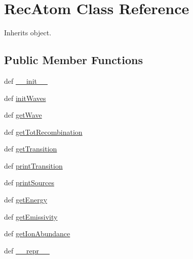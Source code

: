 \hypertarget{classpyneb_1_1core_1_1pynebcore_1_1_rec_atom}{\section{Rec\-Atom Class Reference}
\label{classpyneb_1_1core_1_1pynebcore_1_1_rec_atom}
}


Inherits object.

\subsection*{Public Member Functions}
\begin{DoxyCompactItemize}
\item 
def \hyperlink{classpyneb_1_1core_1_1pynebcore_1_1_rec_atom_ac775ee34451fdfa742b318538164070e}{\-\_\-\-\_\-init\-\_\-\-\_\-}
\item 
def \hyperlink{classpyneb_1_1core_1_1pynebcore_1_1_rec_atom_a585a5ccbf1996b61e811632daf83d9a5}{init\-Waves}
\item 
def \hyperlink{classpyneb_1_1core_1_1pynebcore_1_1_rec_atom_a70e7c07961cb65cbef72a83053ff77c4}{get\-Wave}
\item 
def \hyperlink{classpyneb_1_1core_1_1pynebcore_1_1_rec_atom_a59deba69fded8f0f17b40c917df3a09c}{get\-Tot\-Recombination}
\item 
def \hyperlink{classpyneb_1_1core_1_1pynebcore_1_1_rec_atom_acf586a33a19e340d5da3ddd7fcf84f9c}{get\-Transition}
\item 
def \hyperlink{classpyneb_1_1core_1_1pynebcore_1_1_rec_atom_a69ea809ac1bda5a46d5a167ea3c2754c}{print\-Transition}
\item 
def \hyperlink{classpyneb_1_1core_1_1pynebcore_1_1_rec_atom_a0120b7dbd5f911f8b1df2d2cebf6c09c}{print\-Sources}
\item 
def \hyperlink{classpyneb_1_1core_1_1pynebcore_1_1_rec_atom_a8406acc27904d955ee4dbb458f60db52}{get\-Energy}
\item 
def \hyperlink{classpyneb_1_1core_1_1pynebcore_1_1_rec_atom_aa6ddd446c1d80542fdb2fb93e5d7f1af}{get\-Emissivity}
\item 
def \hyperlink{classpyneb_1_1core_1_1pynebcore_1_1_rec_atom_a71c604d2b2dc23f3435338cdee5d68bf}{get\-Ion\-Abundance}
\item 
def \hyperlink{classpyneb_1_1core_1_1pynebcore_1_1_rec_atom_ad8b9328939df072e4740cd9a63189744}{\-\_\-\-\_\-repr\-\_\-\-\_\-}
\end{DoxyCompactItemize}
